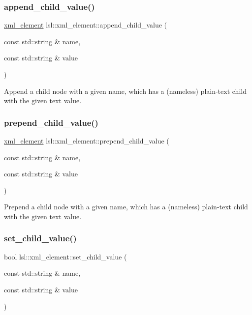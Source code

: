\subsubsection{\texorpdfstring{append\+\_\+child\+\_\+value()}{append\_child\_value()}}
{\footnotesize\ttfamily \hyperlink{classlsl_1_1xml__element}{xml\+\_\+element} lsl\+::xml\+\_\+element\+::append\+\_\+child\+\_\+value (\begin{DoxyParamCaption}\item[{const std\+::string \&}]{name,  }\item[{const std\+::string \&}]{value }\end{DoxyParamCaption})\hspace{0.3cm}{\ttfamily [inline]}}

Append a child node with a given name, which has a (nameless) plain-\/text child with the given text value. \mbox{\label{classlsl_1_1xml__element_a3e7fde09def517574df99c71a0a05d23}} 
\subsubsection{\texorpdfstring{prepend\+\_\+child\+\_\+value()}{prepend\_child\_value()}}
{\footnotesize\ttfamily \hyperlink{classlsl_1_1xml__element}{xml\+\_\+element} lsl\+::xml\+\_\+element\+::prepend\+\_\+child\+\_\+value (\begin{DoxyParamCaption}\item[{const std\+::string \&}]{name,  }\item[{const std\+::string \&}]{value }\end{DoxyParamCaption})\hspace{0.3cm}{\ttfamily [inline]}}

Prepend a child node with a given name, which has a (nameless) plain-\/text child with the given text value. \mbox{\label{classlsl_1_1xml__element_a6fe187e03b36cf8fd5f9d3892e99453f}} 
\subsubsection{\texorpdfstring{set\+\_\+child\+\_\+value()}{set\_child\_value()}}
{\footnotesize\ttfamily bool lsl\+::xml\+\_\+element\+::set\+\_\+child\+\_\+value (\begin{DoxyParamCaption}\item[{const std\+::string \&}]{name,  }\item[{const std\+::string \&}]{value }\end{DoxyParamCaption})\hspace{0.3cm}{\ttfamily [inline]}}

